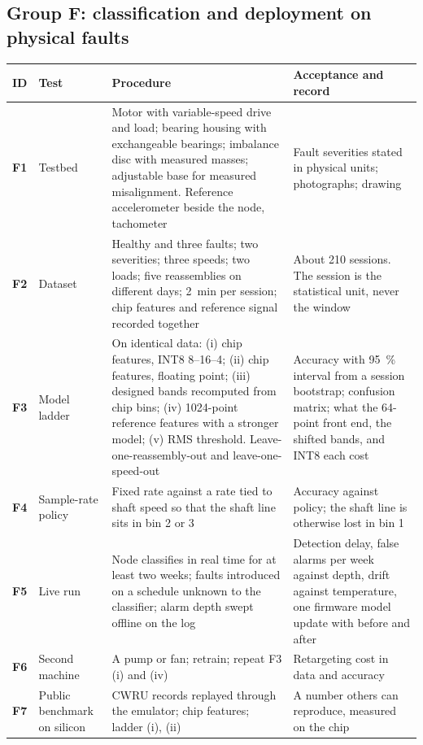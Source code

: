 \documentclass[10pt]{article}
\newcommand{\tid}[1]{\textbf{#1}}
\begin{document}
\subsection*{Group F: classification and deployment on physical faults}
{\small
\begin{longtable}{@{}L{0.8cm}L{3.3cm}L{6.6cm}L{4.3cm}@{}}
\toprule
ID & Test & Procedure & Acceptance and record\\
\midrule
\endhead
\tid{F1} & Testbed & Motor with variable-speed drive and load; bearing housing with exchangeable bearings; imbalance disc with measured masses; adjustable base for measured misalignment. Reference accelerometer beside the node, tachometer & Fault severities stated in physical units; photographs; drawing\\
\tid{F2} & Dataset & Healthy and three faults; two severities; three speeds; two loads; five reassemblies on different days; 2~min per session; chip features and reference signal recorded together & About 210 sessions. The session is the statistical unit, never the window\\
\tid{F3} & Model ladder & On identical data: (i) chip features, INT8 8--16--4; (ii) chip features, floating point; (iii) designed bands recomputed from chip bins; (iv) 1024-point reference features with a stronger model; (v) RMS threshold. Leave-one-reassembly-out and leave-one-speed-out & Accuracy with \SI{95}{\percent} interval from a session bootstrap; confusion matrix; what the 64-point front end, the shifted bands, and INT8 each cost\\
\tid{F4} & Sample-rate policy & Fixed rate against a rate tied to shaft speed so that the shaft line sits in bin 2 or 3 & Accuracy against policy; the shaft line is otherwise lost in bin 1\\
\tid{F5} & Live run & Node classifies in real time for at least two weeks; faults introduced on a schedule unknown to the classifier; alarm depth swept offline on the log & Detection delay, false alarms per week against depth, drift against temperature, one firmware model update with before and after\\
\tid{F6} & Second machine & A pump or fan; retrain; repeat F3 (i) and (iv) & Retargeting cost in data and accuracy\\
\tid{F7} & Public benchmark on silicon & CWRU records replayed through the emulator; chip features; ladder (i), (ii) & A number others can reproduce, measured on the chip\\
\bottomrule
\end{longtable}}
\end{document}
